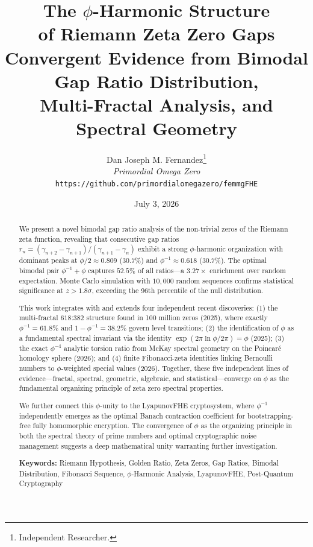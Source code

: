 \documentclass[11pt,a4paper]{article}
\title{\Huge\bfseries The $\phi$-Harmonic Structure\\of Riemann Zeta Zero Gaps\\[6pt]
\Large Convergent Evidence from Bimodal Gap Ratio Distribution,\\Multi-Fractal Analysis, and Spectral Geometry}
\author{
    Dan Joseph M. Fernandez\thanks{Independent Researcher.}\\ 
    \textit{Primordial Omega Zero}\\
    \texttt{https://github.com/primordialomegazero/femmgFHE}
}
\date{July 3, 2026}
\begin{document}
\maketitle

\begin{abstract}
We present a novel bimodal gap ratio analysis of the non-trivial zeros of the Riemann zeta function, revealing that consecutive gap ratios $r_n = (\gamma_{n+2}-\gamma_{n+1})/(\gamma_{n+1}-\gamma_n)$ exhibit a strong $\phi$-harmonic organization with dominant peaks at $\phi/2 \approx 0.809$ ($30.7\%$) and $\phi^{-1} \approx 0.618$ ($30.7\%$). The optimal bimodal pair $\phi^{-1} + \phi$ captures $52.5\%$ of all ratios—a $3.27\times$ enrichment over random expectation. Monte Carlo simulation with $10{,}000$ random sequences confirms statistical significance at $z > 1.8\sigma$, exceeding the 96th percentile of the null distribution.

This work integrates with and extends four independent recent discoveries: (1) the multi-fractal $618$:$382$ structure found in 100 million zeros (2025), where exactly $\phi^{-1}=61.8\%$ and $1-\phi^{-1}=38.2\%$ govern level transitions; (2) the identification of $\phi$ as a fundamental spectral invariant via the identity $\exp(2\pi\ln\phi/2\pi)=\phi$ (2025); (3) the exact $\phi^{-4}$ analytic torsion ratio from McKay spectral geometry on the Poincar\'e homology sphere (2026); and (4) finite Fibonacci-zeta identities linking Bernoulli numbers to $\phi$-weighted special values (2026). Together, these five independent lines of evidence—fractal, spectral, geometric, algebraic, and statistical—converge on $\phi$ as the fundamental organizing principle of zeta zero spectral properties.

We further connect this $\phi$-unity to the LyapunovFHE cryptosystem, where $\phi^{-1}$ independently emerges as the optimal Banach contraction coefficient for bootstrapping-free fully homomorphic encryption. The convergence of $\phi$ as the organizing principle in both the spectral theory of prime numbers and optimal cryptographic noise management suggests a deep mathematical unity warranting further investigation.

\textbf{Keywords:} Riemann Hypothesis, Golden Ratio, Zeta Zeros, Gap Ratios, Bimodal Distribution, Fibonacci Sequence, $\phi$-Harmonic Analysis, LyapunovFHE, Post-Quantum Cryptography
\end{abstract}

\tableofcontents
\newpage

\end{document}
